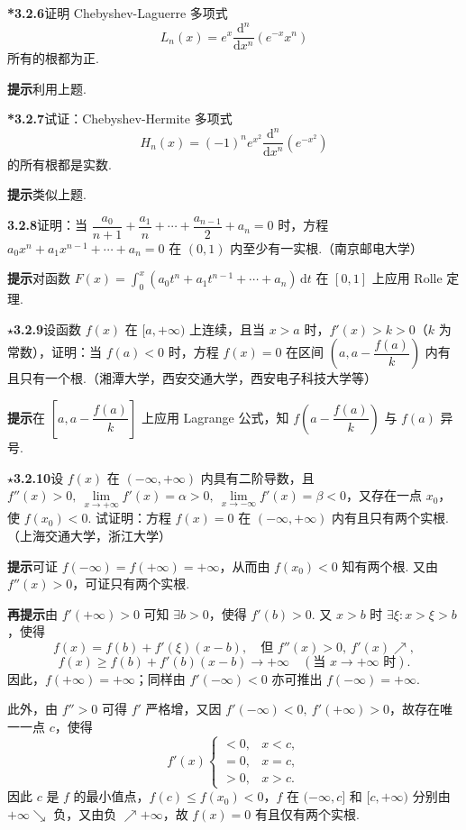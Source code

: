 \documentclass[UTF8,12pt,a4paper,fontset=fandol]{ctexart}
\begin{document}
\noindent\textbf{*3.2.6}\quad 证明 Chebyshev-Laguerre 多项式
\[
  L_n(x)=e^x\frac{\mathrm d^n}{\mathrm dx^n}(e^{-x}x^n)
\]
所有的根都为正.

\noindent\textbf{提示}\quad 利用上题.

\noindent\textbf{*3.2.7}\quad 试证：Chebyshev-Hermite 多项式
\[
  H_n(x)=(-1)^n e^{x^2}\frac{\mathrm d^n}{\mathrm dx^n}(e^{-x^2})
\]
的所有根都是实数.

\noindent\textbf{提示}\quad 类似上题.

\noindent\textbf{3.2.8}\quad 证明：当 $\dfrac{a_0}{n+1}+\dfrac{a_1}{n}+\cdots+\dfrac{a_{n-1}}2+a_n=0$ 时，方程 $a_0x^n+a_1x^{n-1}+\cdots+a_n=0$ 在 $(0,1)$ 内至少有一实根.（南京邮电大学）

\noindent\textbf{提示}\quad 对函数 $F(x)=\int_0^x(a_0t^n+a_1t^{n-1}+\cdots+a_n)\,\mathrm dt$ 在 $[0,1]$ 上应用 Rolle 定理.

\noindent\textbf{$\star$3.2.9}\quad 设函数 $f(x)$ 在 $[a,+\infty)$ 上连续，且当 $x>a$ 时，$f'(x)>k>0$（$k$ 为常数），证明：当 $f(a)<0$ 时，方程 $f(x)=0$ 在区间 $\left(a,a-\dfrac{f(a)}k\right)$ 内有且只有一个根.（湘潭大学，西安交通大学，西安电子科技大学等）

\noindent\textbf{提示}\quad 在 $\left[a,a-\dfrac{f(a)}k\right]$ 上应用 Lagrange 公式，知 $f\left(a-\dfrac{f(a)}k\right)$ 与 $f(a)$ 异号.

\noindent\textbf{$\star$3.2.10}\quad 设 $f(x)$ 在 $(-\infty,+\infty)$ 内具有二阶导数，且 $f''(x)>0,\ \lim\limits_{x\to+\infty}f'(x)=\alpha>0,\ \lim\limits_{x\to-\infty}f'(x)=\beta<0$，又存在一点 $x_0$，使 $f(x_0)<0$. 试证明：方程 $f(x)=0$ 在 $(-\infty,+\infty)$ 内有且只有两个实根.（上海交通大学，浙江大学）

\noindent\textbf{提示}\quad 可证 $f(-\infty)=f(+\infty)=+\infty$，从而由 $f(x_0)<0$ 知有两个根. 又由 $f''(x)>0$，可证只有两个实根.

\noindent\textbf{再提示}\quad 由 $f'(+\infty)>0$ 可知 $\exists b>0$，使得 $f'(b)>0$. 又 $x>b$ 时 $\exists \xi:x>\xi>b$，使得
\[
  f(x)=f(b)+f'(\xi)(x-b),
  \quad\text{但 }f''(x)>0,\ f'(x)\nearrow,
\]
\[
  f(x)\ge f(b)+f'(b)(x-b)\to+\infty\quad(\text{当 }x\to+\infty\text{ 时}).
\]
因此，$f(+\infty)=+\infty$；同样由 $f'(-\infty)<0$ 亦可推出 $f(-\infty)=+\infty$.

此外，由 $f''>0$ 可得 $f'$ 严格增，又因 $f'(-\infty)<0,\ f'(+\infty)>0$，故存在唯一一点 $c$，使得
\[
  f'(x)
  \begin{cases}
  <0,& x<c,\\
  =0,& x=c,\\
  >0,& x>c.
  \end{cases}
\]
因此 $c$ 是 $f$ 的最小值点，$f(c)\le f(x_0)<0$，$f$ 在 $(-\infty,c]$ 和 $[c,+\infty)$ 分别由 $+\infty\searrow$ 负，又由负 $\nearrow+\infty$，故 $f(x)=0$ 有且仅有两个实根.
\end{document}
